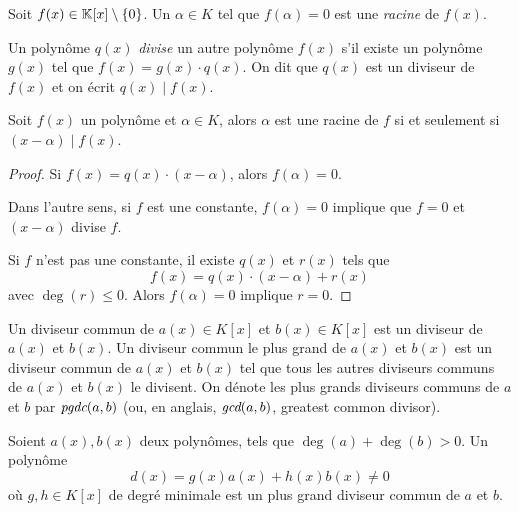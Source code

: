 \begin{definition}
  \label{def:31}
  Soit $f(x) \in \mathbb{K}[x] \setminus\{0\}$. Un $\alpha \in K$ tel que $f(\alpha) = 0$ est une  \emph{ racine} de $f(x)$.  
\end{definition}

\begin{definition}
  \label{def:32}
  Un polynôme  $q(x)$ \emph{divise} un autre polynôme $f(x)$ s'il existe un polynôme $g(x)$ tel que $f(x) = g(x) \cdot q(x)$. On dit que $q(x)$ est un diviseur de $f(x)$ et on écrit $q(x) \mid f(x)$. 
\end{definition}

\begin{theorem}
  \label{thr:35}
  Soit $f(x)$ un polynôme  et $\alpha \in K$, alors $\alpha$ est une racine de $f$ si et seulement si $(x- \alpha)  \mid f(x)$. 
\end{theorem}

\begin{proof}
  Si $f(x) = q(x) \cdot (x - \alpha)$, alors $f(\alpha) = 0$. 

Dans l'autre sens, si $f$ est une constante, $f(\alpha) = 0$ implique que $f = 0$ et $(x - \alpha)$ divise $f$. 

Si $f$ n'est pas une constante, il existe $q(x)$ et $r(x)$ tels que
\begin{displaymath}
  f(x) = q(x) \cdot (x - \alpha) + r(x)
\end{displaymath}
avec $\deg(r) \leq 0$. Alors $f(\alpha) = 0$ implique $r=0$. 
\end{proof}


\begin{definition}
  \label{def:33}
  Un diviseur commun de $a(x) \in K[x]$
  et $b(x) \in K[x]$
  est un diviseur de $a(x)$
  et $b(x)$.
  Un diviseur commun le plus grand de $a(x)$
  et $b(x)$
  est un diviseur commun de $a(x)$
  et $b(x)$
  tel que tous les autres  diviseurs communs de $a(x)$ et $b(x)$ le divisent. On dénote les plus grands diviseurs communs de $a$ et $b$ par $\emph{pgdc}(a,b)$ (ou, en anglais, $\emph{gcd}(a,b)$, greatest common divisor).
\end{definition}


\begin{theorem}
  \label{thr:36}
  Soient $a(x),b(x)$ deux polynômes, tels que $\deg(a)+\deg(b)>0$. Un polynôme 
  \begin{equation}
    \label{eq:25}   
    d(x) = g(x) a(x) + h(x) b(x) \neq 0
  \end{equation}
  où $g,h \in K[x]$ 
  de degré minimale est un plus grand diviseur commun de $a$ et $b$. 
\end{theorem}

